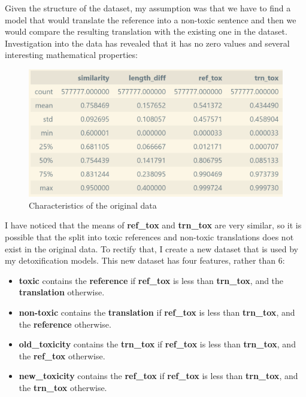 \documentclass[]{article}
\begin{document}
	Given the structure of the dataset, my assumption was that we have to find a model that would translate the reference into a non-toxic sentence and then we would compare the resulting translation with the existing one in the dataset. \\
	
	Investigation into the data has revealed that it has no zero values and several interesting mathematical properties:
	
	\begin{figure}[H]
		\includegraphics[scale=1]{../figures/data1.png}
		\caption{Characteristics of the original data}
	\end{figure} 
	
	I have noticed that the means of \textbf{ref\_tox} and \textbf{trn\_tox} are very similar, so it is possible that the split into toxic references and non-toxic translations does not exist in the original data. To rectify that, I create a new dataset that is used by my detoxification models. This new dataset has four features, rather than 6:
	
	\begin{itemize}
		\item \textbf{toxic} contains the \textbf{reference} if \textbf{ref\_tox} is less than \textbf{trn\_tox}, and the \textbf{translation} otherwise.
		\item \textbf{non-toxic} contains the \textbf{translation} if \textbf{ref\_tox} is less than \textbf{trn\_tox}, and the \textbf{reference} otherwise.
		\item \textbf{old\_toxicity} contains the \textbf{trn\_tox} if \textbf{ref\_tox} is less than \textbf{trn\_tox}, and the \textbf{ref\_tox} otherwise.
		\item \textbf{new\_toxicity} contains the \textbf{ref\_tox} if \textbf{ref\_tox} is less than \textbf{trn\_tox}, and the \textbf{trn\_tox} otherwise.
	\end{itemize} 
	
\end{document}
